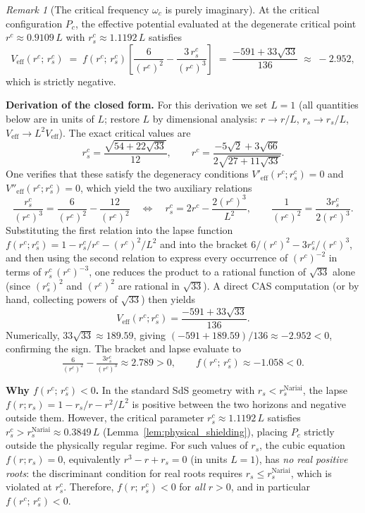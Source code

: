 \documentclass[12pt,a4paper]{amsart}
\theoremstyle{remark}
\newtheorem{remark}[theorem]{Remark}
\begin{document}
\begin{remark}[The critical frequency $\omega_c$ is purely imaginary]
\label{rem:omega_c_imaginary}
At the critical configuration $P_c$, the effective potential evaluated at the
degenerate critical point $r^c \approx 0.9109\,L$ with $r_s^c \approx 1.1192\,L$ satisfies
\[
  V_{\mathrm{eff}}(r^c;\,r_s^c)
  \;=\; f(r^c;\,r_s^c)\!\left[\frac{6}{(r^c)^2} - \frac{3\,r_s^c}{(r^c)^3}\right]
  \;=\; \frac{-591 + 33\sqrt{33}}{136}
  \;\approx\; -2.952,
\]
which is strictly negative.

\medskip
\noindent\textbf{Derivation of the closed form.}
For this derivation we set $L = 1$ (all quantities below are in units of $L$;
restore $L$ by dimensional analysis: $r \to r/L$, $r_s \to r_s/L$,
$V_{\mathrm{eff}} \to L^2 V_{\mathrm{eff}}$). The exact critical values are
\[
  r_s^c = \frac{\sqrt{54+22\sqrt{33}}}{12}, \qquad
  r^c   = \frac{-5\sqrt{2}+3\sqrt{66}}{2\sqrt{27+11\sqrt{33}}}.
\]
One verifies that these satisfy the degeneracy conditions
$V'_{\mathrm{eff}}(r^c;r_s^c)=0$ and $V''_{\mathrm{eff}}(r^c;r_s^c)=0$, which
yield the two auxiliary relations
\begin{equation}\label{eq:rc_relations}
  \frac{r_s^c}{(r^c)^3} = \frac{6}{(r^c)^2} - \frac{12}{(r^c)^2}
  \quad\Longleftrightarrow\quad
  r_s^c = 2r^c - \frac{2(r^c)^3}{L^2},
  \qquad
  \frac{1}{(r^c)^2} = \frac{3r_s^c}{2(r^c)^3}.
\end{equation}
Substituting the first relation into the lapse function
$f(r^c;r_s^c) = 1 - r_s^c/r^c - (r^c)^2/L^2$ and into the bracket
$6/(r^c)^2 - 3r_s^c/(r^c)^3$, and then using the second relation to
express every occurrence of $(r^c)^{-2}$ in terms of
$r_s^c\,(r^c)^{-3}$, one reduces the product to a rational function of
$\sqrt{33}$ alone (since $(r_s^c)^2$ and $(r^c)^2$ are rational in $\sqrt{33}$).
A direct CAS computation (or by hand, collecting powers of $\sqrt{33}$) then
yields
\[
  V_{\mathrm{eff}}(r^c;r_s^c)
  = \frac{-591 + 33\sqrt{33}}{136}.
\]
Numerically, $33\sqrt{33} \approx 189.59$, giving
$(-591 + 189.59)/136 \approx -2.952 < 0$, confirming the sign.
The bracket and lapse evaluate to
\[
  \tfrac{6}{(r^c)^2} - \tfrac{3r_s^c}{(r^c)^3} \approx 2.789 > 0,
  \qquad f(r^c;\,r_s^c) \approx -1.058 < 0.
\]

\medskip
\noindent\textbf{Why $f(r^c;\,r_s^c) < 0$.}
In the standard SdS geometry with $r_s < r_s^{\mathrm{Nariai}}$, the lapse
$f(r; r_s) = 1 - r_s/r - r^2/L^2$ is positive between the two horizons and
negative outside them. However, the critical parameter $r_s^c \approx 1.1192\,L$
satisfies $r_s^c > r_s^{\mathrm{Nariai}} \approx 0.3849\,L$
(Lemma~\ref{lem:physical_shielding}), placing $P_c$ strictly outside
the physically regular regime. For such values of $r_s$, the cubic equation
$f(r; r_s) = 0$, equivalently $r^3 - r + r_s = 0$ (in units $L = 1$),
has \emph{no real positive roots}: the discriminant condition for real roots
requires $r_s \leq r_s^{\mathrm{Nariai}}$, which is violated at $r_s^c$.
Therefore, $f(r;\,r_s^c) < 0$ for \emph{all} $r > 0$, and in particular
$f(r^c;\,r_s^c) < 0$.


\end{remark}
\end{document}
